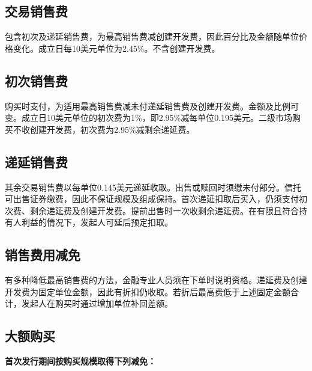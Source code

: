 \documentclass[UTF8,fontset=none,11pt,a4paper]{ctexart}
\begin{document}
\subsection*{交易销售费}
包含初次及递延销售费，为最高销售费减创建开发费，因此百分比及金额随单位价格变化。成立日每10美元单位为2.45\%。不含创建开发费。


\subsection*{初次销售费}
购买时支付，为适用最高销售费减未付递延销售费及创建开发费。金额及比例可变。成立日10美元单位的初次费为1\%，即2.95\%减每单位0.195美元。二级市场购买不收创建开发费，初次费为2.95\%减剩余递延费。


\subsection*{递延销售费}
其余交易销售费以每单位0.145美元递延收取。出售或赎回时须缴未付部分。信托可出售证券缴费，因此不保证规模及组成保持。首次递延扣取后买入，仍须支付初次费、剩余递延费及创建开发费。提前出售时一次收剩余递延费。在有限且符合持有人利益的情况下，发起人可延后预定扣取。


\subsection*{销售费用减免}
有多种降低最高销售费的方法，金融专业人员须在下单时说明资格。递延费及创建开发费为固定单位金额，因此有折扣仍收取。若折后最高费低于上述固定金额合计，发起人在购买时通过增加单位补回差额。


\subsection*{大额购买}
\textbf{首次发行期间按购买规模取得下列减免：}
\end{document}
